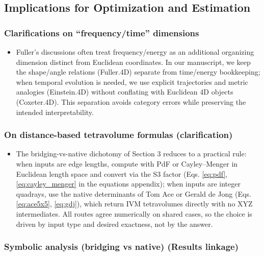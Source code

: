 \documentclass[
  10pt,
]{article}
\providecommand{\tightlist}{%
  \setlength{\itemsep}{0pt}\setlength{\parskip}{0pt}}
\begin{document}
\subsection{Implications for Optimization and
Estimation}\label{implications-for-optimization-and-estimation}

\subsubsection{Clarifications on ``frequency/time''
dimensions}\label{clarifications-on-frequencytime-dimensions}

\begin{itemize}
\tightlist
\item
  Fuller's discussions often treat frequency/energy as an additional
  organizing dimension distinct from Euclidean coordinates. In our
  manuscript, we keep the shape/angle relations (Fuller.4D) separate
  from time/energy bookkeeping; when temporal evolution is needed, we
  use explicit trajectories and metric analogies (Einstein.4D) without
  conflating with Euclidean 4D objects (Coxeter.4D). This separation
  avoids category errors while preserving the intended interpretability.
\end{itemize}

\subsubsection{On distance-based tetravolume formulas
(clarification)}\label{on-distance-based-tetravolume-formulas-clarification}

\begin{itemize}
\tightlist
\item
  The bridging-vs-native dichotomy of Section 3 reduces to a practical
  rule: when inputs are edge lengths, compute with PdF or Cayley--Menger
  in Euclidean length space and convert via the S3 factor (Eqs.
  \eqref{eq:pdf}, \eqref{eq:cayley_menger} in the equations appendix);
  when inputs are integer quadrays, use the native determinants of Tom
  Ace or Gerald de Jong (Eqs. \eqref{eq:ace5x5}, \eqref{eq:gdj}), which
  return IVM tetravolumes directly with no XYZ intermediates. All routes
  agree numerically on shared cases, so the choice is driven by input
  type and desired exactness, not by the answer.
\end{itemize}

\subsubsection{Symbolic analysis (bridging vs native) (Results
linkage)}\label{symbolic-analysis-bridging-vs-native-results-linkage}
\end{document}
